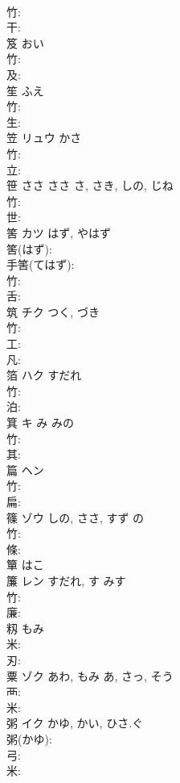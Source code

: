 \documentclass[8pt]{extreport}
\begin{document}
\begin{CJK}{UTF8}{min}
\\	竹: 
\\	干: 
\\	笈			おい			
\\	竹: 
\\	及: 
\\	笙		ふえ				
\\	竹: 
\\	生: 
\\	笠	リュウ	かさ		
\\	竹: 
\\	立: 
\\	笹	ささ	ささ	さ, さき, しの, じね	
\\	竹: 
\\	世: 
\\	筈	カツ	はず, やはず		
\\	筈(はず): 
\\	手筈(てはず): 
\\	竹: 
\\	舌: 
\\	筑	チク		つく, づき	
\\	竹: 
\\	工: 
\\	凡: 
\\	箔	ハク	すだれ		
\\	竹: 
\\	泊: 
\\	箕	キ	み	みの	
\\	竹: 
\\	其: 
\\	篇	ヘン			
\\	竹: 
\\	扁: 
\\	篠	ゾウ	しの, ささ, すず	の	
\\	竹: 
\\	條: 
\\	簞		はこ				
\\	簾	レン	すだれ, す	みす	
\\	竹: 
\\	廉: 
\\	籾		もみ				
\\	米: 
\\	刃: 
\\	粟	ゾク	あわ, もみ	あ, さっ, そう	
\\	襾: 
\\	米: 
\\	粥	イク	かゆ, かい, ひさ.ぐ		
\\	粥(かゆ): 
\\	弓: 
\\	米: 

\end{CJK}
\end{document}
